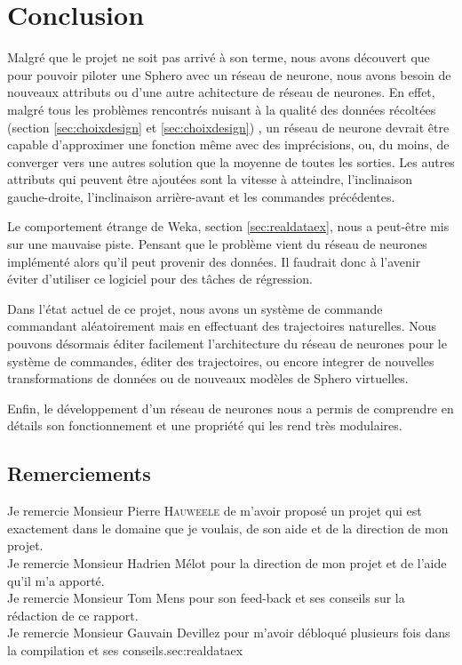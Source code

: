 \documentclass[12pt,a4paper,oneside, titlepage]{article}
\begin{document}




\section{Conclusion}
Malgré que le projet ne soit pas arrivé à son terme, nous avons découvert que pour pouvoir piloter une Sphero avec un réseau de neurone, nous avons besoin de nouveaux attributs ou d'une autre achitecture de réseau de neurones.
En effet, malgré tous les problèmes rencontrés nuisant à la qualité des données récoltées (section \ref{sec:choixdesign} et \ref{sec:choixdesign}) ,
un réseau de neurone devrait être capable d'approximer une fonction même avec des imprécisions, ou, du moins, de converger vers une autres solution que la moyenne de toutes les sorties.
Les autres attributs qui peuvent être ajoutées sont la vitesse à atteindre, l'inclinaison gauche-droite, l'inclinaison arrière-avant et les commandes précédentes.

Le comportement étrange de Weka, section \ref{sec:realdataex}, nous a peut-être mis sur une mauvaise piste.
Pensant que le problème vient du réseau de neurones implémenté alors qu'il peut provenir des données.
Il faudrait donc à l'avenir éviter d'utiliser ce logiciel pour des tâches de régression.

Dans l'état actuel de ce projet, nous avons un système de commande commandant aléatoirement mais en effectuant des trajectoires naturelles.
Nous pouvons désormais éditer facilement l'architecture du réseau de neurones pour le système de commandes,
éditer des trajectoires,
ou encore integrer de nouvelles transformations de données ou de nouveaux modèles de Sphero virtuelles.

Enfin, le développement d'un réseau de neurones nous a permis de comprendre en détails son fonctionnement et une propriété qui les rend très modulaires.

\subsection*{Remerciements}
\noindent Je remercie Monsieur Pierre \textsc{Hauweele} de m'avoir proposé un projet qui est exactement dans le domaine que je voulais, de son aide et de la direction de mon projet.\\

\noindent Je remercie Monsieur Hadrien Mélot pour la direction de mon projet et de l'aide qu'il m'a apporté.\\

\noindent Je remercie Monsieur Tom Mens pour son feed-back et ses conseils sur la rédaction de ce rapport.\\

\noindent Je remercie Monsieur Gauvain Devillez pour m'avoir débloqué plusieurs fois dans la compilation et ses conseils.sec:realdataex


\appendix



\end{document}
